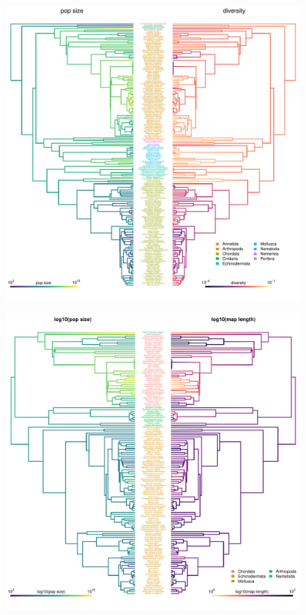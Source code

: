 \documentclass[11pt]{article}
\begin{document}
\begin{figure}[!htb]
  \centering
  \includegraphics[width=\textwidth]{figures/biconmap_diversity.pdf}

  \caption{}

  \label{suppfig:biconmap_diversity}
\end{figure}



\begin{figure}[!htb]
  \centering
  \includegraphics[width=\textwidth]{figures/biconmap.pdf}

  \caption{}

  \label{suppfig:biconmap}
\end{figure}
\end{document}
